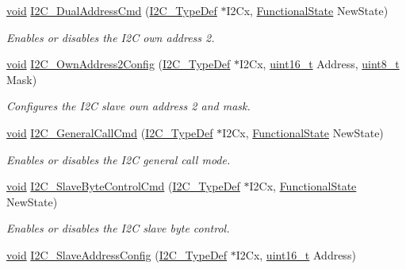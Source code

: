 \begin{DoxyCompactItemize}
\hyperlink{group___n_a_m_e_ga18028b8badbf1ea7e704ccac3c488e82}{void} \hyperlink{group___i2_c___group1_ga02145a333a56e79557d6ef4ea03fc313}{I2\-C\-\_\-\-Dual\-Address\-Cmd} (\hyperlink{struct_i2_c___type_def}{I2\-C\-\_\-\-Type\-Def} $\ast$I2\-Cx, \hyperlink{group___exported__types_gac9a7e9a35d2513ec15c3b537aaa4fba1}{Functional\-State} New\-State)
\begin{DoxyCompactList}\small\item\em Enables or disables the I2\-C own address 2. \end{DoxyCompactList}\item 
\hyperlink{group___n_a_m_e_ga18028b8badbf1ea7e704ccac3c488e82}{void} \hyperlink{group___i2_c___group1_gafda91909ad978cc8531ca190109f4f2c}{I2\-C\-\_\-\-Own\-Address2\-Config} (\hyperlink{struct_i2_c___type_def}{I2\-C\-\_\-\-Type\-Def} $\ast$I2\-Cx, \hyperlink{stdint_8h_a273cf69d639a59973b6019625df33e30}{uint16\-\_\-t} Address, \hyperlink{stdint_8h_aba7bc1797add20fe3efdf37ced1182c5}{uint8\-\_\-t} Mask)
\begin{DoxyCompactList}\small\item\em Configures the I2\-C slave own address 2 and mask. \end{DoxyCompactList}\item 
\hyperlink{group___n_a_m_e_ga18028b8badbf1ea7e704ccac3c488e82}{void} \hyperlink{group___i2_c___group1_ga65c740fc8d7b3b9f15cc432d8699d471}{I2\-C\-\_\-\-General\-Call\-Cmd} (\hyperlink{struct_i2_c___type_def}{I2\-C\-\_\-\-Type\-Def} $\ast$I2\-Cx, \hyperlink{group___exported__types_gac9a7e9a35d2513ec15c3b537aaa4fba1}{Functional\-State} New\-State)
\begin{DoxyCompactList}\small\item\em Enables or disables the I2\-C general call mode. \end{DoxyCompactList}\item 
\hyperlink{group___n_a_m_e_ga18028b8badbf1ea7e704ccac3c488e82}{void} \hyperlink{group___i2_c___group1_ga1bf62b6edeff52d7ca42987d31ec62e0}{I2\-C\-\_\-\-Slave\-Byte\-Control\-Cmd} (\hyperlink{struct_i2_c___type_def}{I2\-C\-\_\-\-Type\-Def} $\ast$I2\-Cx, \hyperlink{group___exported__types_gac9a7e9a35d2513ec15c3b537aaa4fba1}{Functional\-State} New\-State)
\begin{DoxyCompactList}\small\item\em Enables or disables the I2\-C slave byte control. \end{DoxyCompactList}\item 
\hyperlink{group___n_a_m_e_ga18028b8badbf1ea7e704ccac3c488e82}{void} \hyperlink{group___i2_c___group1_ga87c713b95d704feb1d19aa9ef0d5b87a}{I2\-C\-\_\-\-Slave\-Address\-Config} (\hyperlink{struct_i2_c___type_def}{I2\-C\-\_\-\-Type\-Def} $\ast$I2\-Cx, \hyperlink{stdint_8h_a273cf69d639a59973b6019625df33e30}{uint16\-\_\-t} Address)

\end{DoxyCompactItemize}
